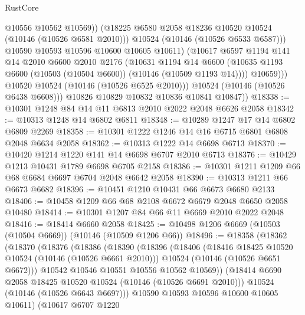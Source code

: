 \begin{lexlean}{RustCore}
\begin{coremodule}
                        @10556
                        @10562
                        @10569))
                    (@18225 @6580 @2058 @18236 @10520 @10524 (@10146 (@10526 @6581 @2010)))
                    @10524
                    (@10146 (@10526 @6533 @6587)))
                  @10590
                  @10593
                  @10596
                  @10600
                  @10605
                  @10611)
                (@10617
                  @6597
                  @1194
                  @141
                  @14
                  @2010
                  @6600
                  @2010
                  @2176
                  (@10631
                    @1194
                    @14
                    @6600
                    (@10635 @1193 @6600 (@10503 (@10504 @6600)) (@10146 (@10509 @1193 @14))))
                  @10659)))
            @10520
            @10524
            (@10146 (@10526 @6525 @2010)))
          @10524
          (@10146 (@10526 @6438 @6608)))
        @10826
        @10829
        @10832
        @10836
        @10841
        @10847))
@18338 := @10301 @1248 @84 @14 @11 @6813 @2010 @2022 @2048 @6626 @2058
@18342 := @10313 @1248 @14 @6802 @6811
@18348 := @10289 @1247 @17 @14 @6802 @6809 @2269
@18358 := @10301 @1222 @1246 @14 @16 @6715 @6801 @6808 @2048 @6634 @2058
@18362 := @10313 @1222 @14 @6698 @6713
@18370 := @10420 @1214 @1220 @141 @14 @6698 @6707 @2010 @6713
@18376 := @10429 @1213 @10431 @1789 @6698 @6705 @2158
@18386 := @10301 @1211 @1209 @66 @68 @6684 @6697 @6704 @2048 @6642 @2058
@18390 := @10313 @1211 @66 @6673 @6682
@18396 := @10451 @1210 @10431 @66 @6673 @6680 @2133
@18406 := @10458 @1209 @66 @68 @2108 @6672 @6679 @2048 @6650 @2058 @10480
@18414 := @10301 @1207 @84 @66 @11 @6669 @2010 @2022 @2048
@18416 := @18414 @6660 @2058
@18425 := @10498 @1206 @6669 (@10503 (@10504 @6669)) (@10146 (@10509 @1206 @66))
@18496 := @18358
    (@18362
      (@18370
        (@18376
          (@18386
            (@18390
              (@18396
                (@18406
                  (@18416 @18425 @10520 @10524 (@10146 (@10526 @6661 @2010)))
                  @10524
                  (@10146 (@10526 @6651 @6672)))
                @10542
                @10546
                @10551
                @10556
                @10562
                @10569))
            (@18414 @6690 @2058 @18425 @10520 @10524 (@10146 (@10526 @6691 @2010)))
            @10524
            (@10146 (@10526 @6643 @6697)))
          @10590
          @10593
          @10596
          @10600
          @10605
          @10611)
        (@10617
          @6707
          @1220

\end{coremodule}
\end{lexlean}
